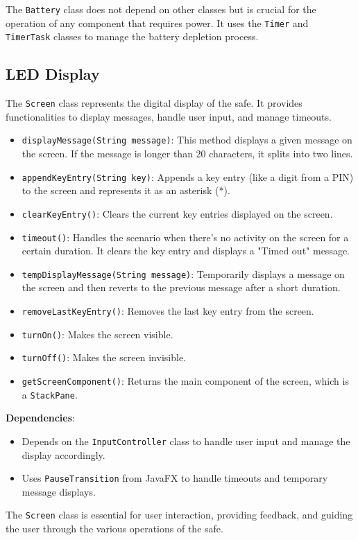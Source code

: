 \documentclass{article}
\begin{document}
The \texttt{Battery} class does not depend on other classes but is crucial for the operation of any component that requires power. It uses the \texttt{Timer} and \texttt{TimerTask} classes to manage the battery depletion process.


\subsection{LED Display}
The \texttt{Screen} class represents the digital display of the safe. It provides functionalities to display messages, handle user input, and manage timeouts.

\begin{itemize}
    \item \texttt{displayMessage(String message)}: This method displays a given message on the screen. If the message is longer than 20 characters, it splits into two lines.
    \item \texttt{appendKeyEntry(String key)}: Appends a key entry (like a digit from a PIN) to the screen and represents it as an asterisk (*).
    \item \texttt{clearKeyEntry()}: Clears the current key entries displayed on the screen.
    \item \texttt{timeout()}: Handles the scenario when there's no activity on the screen for a certain duration. It clears the key entry and displays a "Timed out" message.
    \item \texttt{tempDisplayMessage(String message)}: Temporarily displays a message on the screen and then reverts to the previous message after a short duration.
    \item \texttt{removeLastKeyEntry()}: Removes the last key entry from the screen.
    \item \texttt{turnOn()}: Makes the screen visible.
    \item \texttt{turnOff()}: Makes the screen invisible.
    \item \texttt{getScreenComponent()}: Returns the main component of the screen, which is a \texttt{StackPane}.
\end{itemize}
\textbf{Dependencies}:
\begin{itemize}
    \item Depends on the \texttt{InputController} class to handle user input and manage the display accordingly.
    \item Uses \texttt{PauseTransition} from JavaFX to handle timeouts and temporary message displays.
\end{itemize}
The \texttt{Screen} class is essential for user interaction, providing feedback, and guiding the user through the various operations of the safe.
\end{document}
